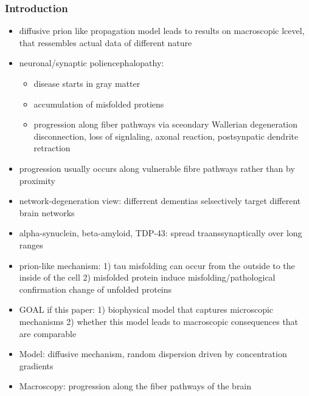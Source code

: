 \documentclass[fleqn]{article}\usepackage{caption}
\begin{document}
\subsubsection{Introduction}
\begin{itemize}
\item diffusive prion like propagation model leads to results on macroscopic lcevel, that ressembles actual data  of different nature
\item neuronal/synaptic poliencephalopathy:
\begin{itemize}
\item disease starts in gray matter
\item accumulation of misfolded protiens
\item progression along fiber pathways via sceondary Wallerian degeneration disconnection, loss of signlaling, axonal reaction, postsynpatic dendrite retraction
\end{itemize}
\item progression usually occurs along vulnerable fibre pathways rather than by proximity
\item network-degeneration view: differrent dementias selsectively target different brain networks
\item alpha-synuclein, beta-amyloid, TDP-43: spread traanssynaptically over long ranges
\item prion-like mechanism: 1) tau misfolding can occur from the outside to the inside of the cell 2) misfolded protein induce misfolding/pathological confirmation change of unfolded proteins
\item GOAL if this paper: 1) biophysical model that captures microscopic mechanisms 2) whether this model leads to macroscopic consequences that are comparable 
\item Model: diffusive mechanism, random dispersion driven by concentration gradients
\item Macroscopy: progression along the fiber pathways of the brain
\end{itemize} 
\end{document}
